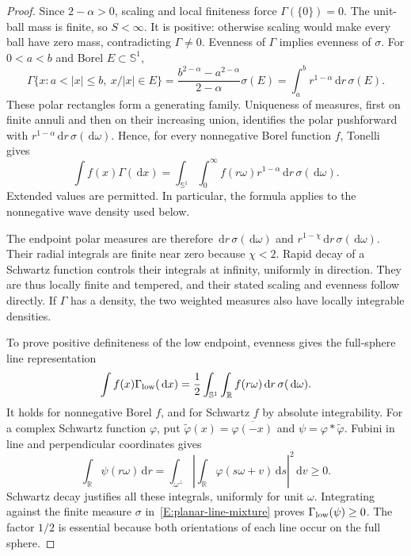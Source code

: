 \documentclass[12pt]{article}
\numberwithin{equation}{section}
\theoremstyle{definition}
\newcommand{\R}{\mathbb{R}}
\newcommand{\ud}{\,\mathrm{d}}
\begin{document}
\begin{proof}
  Since $2-\alpha>0$, scaling and local finiteness force
  $\Gamma(\{0\})=0$. The unit-ball mass is finite, so $S<\infty$.
  It is positive: otherwise scaling would make every ball have zero
  mass, contradicting $\Gamma\ne0$. Evenness of $\Gamma$ implies
  evenness of $\sigma$. For $0<a<b$ and Borel $E\subset\mathbb{S}^1$,
  \[
    \Gamma\{x:a<|x|\le b,\ x/|x|\in E\}
    =\frac{b^{2-\alpha}-a^{2-\alpha}}{2-\alpha}\sigma(E)
    =\int_a^b r^{1-\alpha}\ud r\,\sigma(E).
  \]
  These polar rectangles form a generating family. Uniqueness of
  measures, first on finite annuli and then on their increasing union,
  identifies the polar pushforward with
  $r^{1-\alpha}\ud r\,\sigma(\ud\omega)$. Hence, for every
  nonnegative Borel function $f$, Tonelli gives
  \begin{equation}\label{E:planar-polar}
    \int f(x)\Gamma(\ud x)
    =\int_{\mathbb{S}^1}\int_0^\infty
    f(r\omega)r^{1-\alpha}\ud r\,\sigma(\ud\omega).
  \end{equation}
  Extended values are permitted. In particular, the formula applies
  to the nonnegative wave density used below.

  The endpoint polar measures are therefore
  $\ud r\,\sigma(\ud\omega)$ and
  $r^{1-\chi}\ud r\,\sigma(\ud\omega)$. Their radial integrals
  are finite near zero because $\chi<2$. Rapid decay of a Schwartz
  function controls their integrals at infinity, uniformly in direction.
  They are thus locally finite and tempered, and their stated scaling
  and evenness follow directly. If $\Gamma$ has a density, the two
  weighted measures also have locally integrable densities.

  To prove positive definiteness of the low endpoint, evenness gives
  the full-sphere line representation
  \begin{equation}\label{E:planar-line-mixture}
    \int f(x)\Gamma_{\rm low}(\ud x)
    =\frac12\int_{\mathbb{S}^1}\int_\R f(r\omega)\ud r
    \,\sigma(\ud\omega).
  \end{equation}
  It holds for nonnegative Borel $f$, and for Schwartz $f$ by absolute
  integrability. For a complex Schwartz function $\varphi$, put
  $\widetilde{\varphi}(x)=\overline{\varphi(-x)}$ and
  $\psi=\varphi*\widetilde{\varphi}$. Fubini in line and perpendicular
  coordinates gives
  \[
    \int_\R\psi(r\omega)\ud r
    =\int_{\omega^\perp}
    \left|\int_\R\varphi(s\omega+v)\ud s\right|^2\ud v\ge0.
  \]
  Schwartz decay justifies all these integrals, uniformly for unit
  $\omega$. Integrating against the finite measure $\sigma$
  in~\eqref{E:planar-line-mixture} proves
  $\Gamma_{\rm low}(\psi)\ge0$. The factor $1/2$ is essential because
  both orientations of each line occur on the full sphere.


\end{proof}
\end{document}

